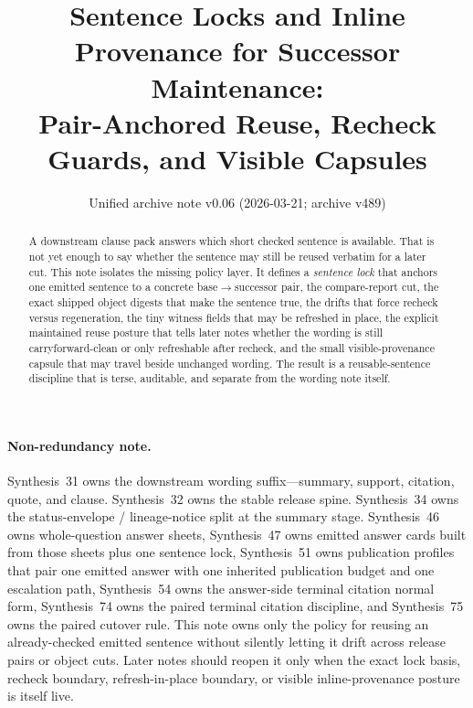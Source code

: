 \documentclass[11pt]{article}
\title{Sentence Locks and Inline Provenance for Successor Maintenance:\\[0.5ex]
\large Pair-Anchored Reuse, Recheck Guards, and Visible Capsules}
\author{}
\date{Unified archive note v0.06 (2026-03-21; archive v489)}
\begin{document}
\maketitle

\begin{abstract}
A downstream clause pack answers which short checked sentence is available.
That is not yet enough to say whether the sentence may still be reused verbatim for a later cut.
This note isolates the missing policy layer.
It defines a \emph{sentence lock} that anchors one emitted sentence to a concrete base$\to$successor pair, the compare-report cut, the exact shipped object digests that make the sentence true, the drifts that force recheck versus regeneration, the tiny witness fields that may be refreshed in place, the explicit maintained reuse posture that tells later notes whether the wording is still carryforward-clean or only refreshable after recheck, and the small visible-provenance capsule that may travel beside unchanged wording.
The result is a reusable-sentence discipline that is terse, auditable, and separate from the wording note itself.
\end{abstract}

\paragraph{Non-redundancy note.}
Synthesis~31 owns the downstream wording suffix---summary, support, citation, quote, and clause.\cite{series:downstreamnormalforms}
Synthesis~32 owns the stable release spine.\cite{series:releasespine}
Synthesis~34 owns the status-envelope / lineage-notice split at the summary stage.\cite{series:statusenvelopes}
Synthesis~46 owns whole-question answer sheets, Synthesis~47 owns emitted answer cards built from those sheets plus one sentence lock, Synthesis~51 owns publication profiles that pair one emitted answer with one inherited publication budget and one escalation path, Synthesis~54 owns the answer-side terminal citation normal form, Synthesis~74 owns the paired terminal citation discipline, and Synthesis~75 owns the paired cutover rule.\cite{series:challengeanswersheets,series:challengeanswercards,series:challengeanswerpublicationprofiles,series:challengeanswerreviewmenus,series:pairedterminalcitationdiscipline,series:pairedterminalcutoverrules}
This note owns only the policy for reusing an already-checked emitted sentence without silently letting it drift across release pairs or object cuts. Later notes should reopen it only when the exact lock basis, recheck boundary, refresh-in-place boundary, or visible inline-provenance posture is itself live.
\end{document}
